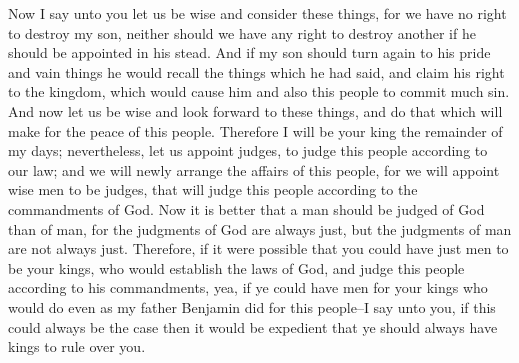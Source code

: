Now I say unto you let us be wise and consider these things, for we have no right to destroy my son, neither should we have any right to destroy another if he should be appointed in his stead.
\bverse \iffalse And if my son should turn again to his pride and vain things he would recall the things which he had said, and claim his right to the kingdom, which would cause him and also this people to commit much sin. \fi
And if my son should turn again to his pride and vain things he would recall the things which he had said, and claim his right to the kingdom, which would cause him and also this people to commit much sin.
\bverse \iffalse And now let us be wise and look forward to these things, and do that which will make for the peace of this people. \fi
And now let us be wise and look forward to these things, and do that which will make for the peace of this people.
\bverse \iffalse Therefore I will be your king the remainder of my days; nevertheless, let us appoint judges, to judge this people according to our law; and we will newly arrange the affairs of this people, for we will appoint wise men to be judges, that will judge this people according to the commandments of God. \fi
Therefore I will be your king the remainder of my days; nevertheless, let us appoint judges, to judge this people according to our law; and we will newly arrange the affairs of this people, for we will appoint wise men to be judges, that will judge this people according to the commandments of God.
\bverse \iffalse Now it is better that a man should be judged of God than of man, for the judgments of God are always just, but the judgments of man are not always just. \fi
Now it is better that a man should be judged of God than of man, for the judgments of God are always just, but the judgments of man are not always just.
\bverse \iffalse Therefore, if it were possible that you could have just men to be your kings, who would establish the laws of God, and judge this people according to his commandments, yea, if ye could have men for your kings who would do even as my father Benjamin did for this people--I say unto you, if this could always be the case then it would be expedient that ye should always have kings to rule over you. \fi
Therefore, if it were possible that you could have just men to be your kings, who would establish the laws of God, and judge this people according to his commandments, yea, if ye could have men for your kings who would do even as my father Benjamin did for this people--I say unto you, if this could always be the case then it would be expedient that ye should always have kings to rule over you.

